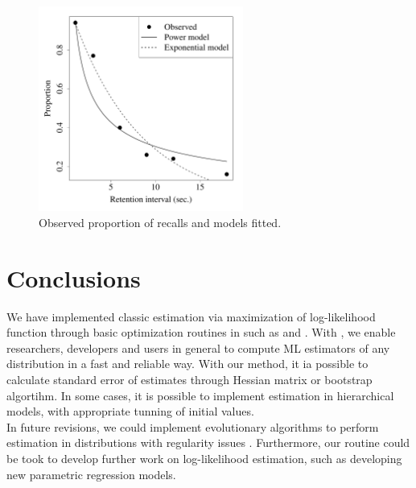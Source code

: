 \documentclass[nojss]{jss}
\begin{document}
\begin{figure}[H]
\centering
  \includegraphics[width=0.6\textwidth]{article-RetentionPlot}
  \caption{\label{fig:forgetting} Observed proportion of recalls and models fitted.}
\end{figure}


\section{Conclusions} \label{sec:conclussions}

We have implemented classic estimation via maximization of log-likelihood function through basic optimization routines in  such as  and . With , we enable researchers, developers and users in general to compute ML estimators of any distribution in a fast and reliable way. With our  method, it ia possible to calculate standard error of estimates through Hessian matrix or bootstrap algortihm. In some cases, it is possible to implement estimation in hierarchical models, with appropriate tunning of initial values. \\

In future revisions, we could implement evolutionary algorithms to perform estimation in distributions with regularity issues \citep{Haupt2003}. Furthermore, our routine could be took to develop further work on log-likelihood estimation, such as developing new parametric regression models.



\end{document}
